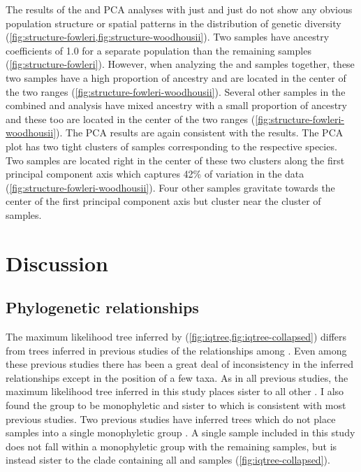 The results of the \structure and PCA analyses with just \fowl and just \wood 
do not show any obvious population structure or spatial patterns in the distribution of 
genetic diversity 
(\cref{fig:structure-fowleri,fig:structure-woodhousii}).
Two \wood samples have ancestry coefficients of 1.0 for a separate population
than the remaining samples (\cref{fig:structure-fowleri}).
However, when analyzing the \fowl and \wood samples together, these two samples 
have a high proportion of \fowl ancestry and are located 
in the center of the two ranges (\cref{fig:structure-fowleri-woodhousii}).
Several other samples in the combined \fowl and \wood analysis have mixed ancestry 
with a small proportion of \wood ancestry and these too are located in the center of the two ranges
(\cref{fig:structure-fowleri-woodhousii}). 
The PCA results are again consistent with the \structure results.
The PCA plot has two tight clusters of samples corresponding to the respective 
species. Two samples are located right in the center of these two clusters along
the first principal component axis which captures 42\% of variation in the data (\cref{fig:structure-fowleri-woodhousii}).
Four other samples gravitate towards the center of the first principal component 
axis but cluster near the \fowl cluster of samples. 


\section{Discussion}

\subsection{Phylogenetic relationships}
The maximum likelihood tree inferred by \iqtree (\cref{fig:iqtree,fig:iqtree-collapsed}) 
differs from trees inferred in previous studies of the relationships 
among \anaxyrus \parencite{fontenot2011,graybeal1997,masta2002,pramuk2007,pyron2011,portik2023}.
Even among these previous studies there has been a great deal of inconsistency in
the inferred relationships except in the position of a few taxa.
As in all previous studies, the maximum likelihood tree inferred in this 
study places \punctatus sister to all other \anaxyrus.
I also found the \americanus group to be monophyletic and sister to \microscaphus 
which is consistent with most previous studies.
Two previous studies have inferred trees which do not place \fowl samples
into a single monophyletic group \parencite{masta2002,fontenot2011}.
A single \fowl sample included in this study does not fall within a monophyletic 
group with the remaining \fowl samples, but is instead sister to the clade 
containing all \fowl and \wood samples (\cref{fig:iqtree-collapsed}).

